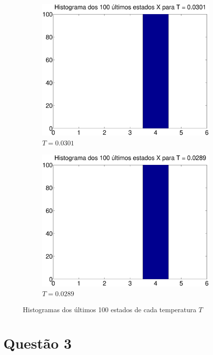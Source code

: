 \documentclass{report}
\begin{document}
\begin{figure}
\begin{subfigure}{0.32\textwidth}
		\includegraphics[width = \textwidth]{Q2_e_histograma_x_t_9}
		\caption{$T = 0.0301$}
	\end{subfigure}
		\begin{subfigure}{0.32\textwidth}
		\centering
		\includegraphics[width = \textwidth]{Q2_e_histograma_x_t_10}
		\caption{$T = 0.0289$}
	\end{subfigure}
	\caption{Histogramas dos últimos 100 estados de cada temperatura $T$}
	\label{histogramas_estados_temperaturas}
\end{figure}

\section*{Questão 3}
\end{document}
